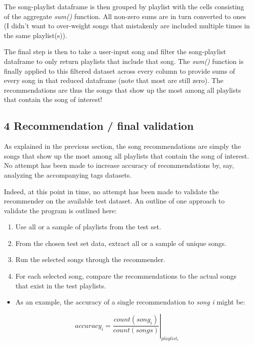 \documentclass[11pt]{article}
\providecommand{\tightlist}{%
      \setlength{\itemsep}{0pt}\setlength{\parskip}{0pt}}
\begin{document}
The song-playlist dataframe is then grouped by playlist with the cells
consisting of the aggregate \emph{sum()} function. All non-zero sums are
in turn converted to ones (I didn't want to over-weight songs that
mistakenly are included multiple times in the same playlist(s)).

The final step is then to take a user-input song and filter the
song-playlist dataframe to only return playlists that include that song.
The \emph{sum()} function is finally applied to this filtered dataset
across every column to provide sums of every song in that reduced
dataframe (note that most are still zero). The recommendations are thus
the songs that show up the most among all playlists that contain the
song of interest!

    \subsection{4 Recommendation / final
validation}\label{recommendation-final-validation}

    As explained in the previous section, the song recommendations are
simply the songs that show up the most among all playlists that contain
the song of interest. No attempt has been made to increase accuracy of
recommendations by, say, analyzing the accompanying tags datasets.

Indeed, at this point in time, no attempt has been made to validate the
recommender on the available test dataset. An outline of one approach to
validate the program is outlined here:

\begin{enumerate}
\def\labelenumi{\arabic{enumi}.}
\tightlist
\item
  Use all or a sample of playlists from the test set.
\item
  From the chosen test set data, extract all or a sample of unique
  songs.
\item
  Run the selected songs through the recommender.
\item
  For each selected song, compare the recommendations to the actual
  songs that exist in the test playlists.
\end{enumerate}

\begin{itemize}
\tightlist
\item
  As an example, the accuracy of a single recommendation to \emph{song
  i} might be:
\end{itemize}

\[
  \left.accuracy_i = \frac{count(song_i)}{count(songs)}\right\vert_{playlist_i}
  \]
\end{document}
